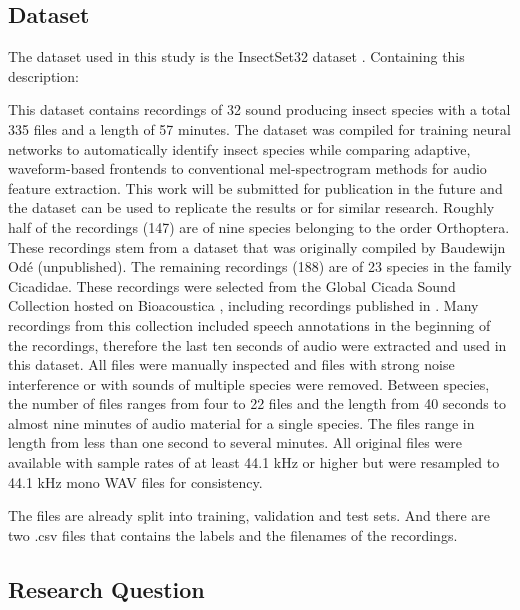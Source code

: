 \subsection{Dataset}

The dataset used in this study is the InsectSet32 dataset \autocite{faissInsectSet32DatasetAutomatic2022}. 
Containing this description:

This dataset contains recordings of 32 sound producing insect species with a total 335 files and a length of 57 minutes. 
The dataset was compiled for training neural networks to automatically identify insect species while comparing adaptive, 
waveform-based frontends to conventional mel-spectrogram methods for audio feature extraction. 
This work will be submitted for publication in the future and the dataset can be used to replicate the results or for similar research. 
Roughly half of the recordings (147) are of nine species belonging to the order Orthoptera. 
These recordings stem from a dataset that was originally compiled by Baudewijn Odé (unpublished). 
The remaining recordings (188) are of 23 species in the family Cicadidae. 
These recordings were selected from the Global Cicada Sound Collection hosted on Bioacoustica \autocite{bakerBioAcousticaFreeOpen2015}, 
including recordings published in \autocites{bakerGlobalCicadaSound2015}{poppleRevisionMyopsaltaCrucifera2017}.
Many recordings from this collection included speech annotations in the beginning of the recordings, 
therefore the last ten seconds of audio were extracted and used in this dataset. 
All files were manually inspected and files with strong noise interference or with sounds of multiple species were removed. 
Between species, the number of files ranges from four to 22 files and the length from 40 seconds to almost nine minutes of audio material for a single species. 
The files range in length from less than one second to several minutes. 
All original files were available with sample rates of at least 44.1 kHz or higher but were resampled to 44.1 kHz mono WAV files for consistency.

The files are already split into training, validation and test sets. And there are two .csv files that contains
the labels and the filenames of the recordings.


\subsection{Research Question}


